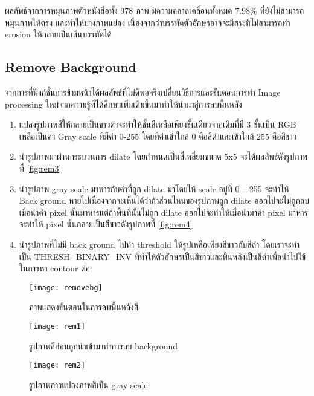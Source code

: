 ผลลัพธ์จากการหมุนภาพตัวหนังสือทั้ง 978 ภาพ มีความคลาดเคลื่อนทั้งหมด 7.98\% ที่ยังไม่สามารถหมุนภาพให้ตรง และทำให้บางภาพแย่ลง เนื่องจากว่าบรรทัดตัวอักษรอาจจะมีสระที่ไม่สามารถทำ erosion ให้กลายเป็นเส้นบรรทัดได้
\subsection{Remove Background}

จากการที่ฟังก์ชั่นการข้ามหน้าได้ผลลัพธ์ที่ไม่ดีพอจริงเปลี่ยนวิธีการและขั้นตอนการทำ Image processing ใหม่จากความรู้ที่ได้ศึกษาเพิ่มเติมขึ้นมาทำให้นำมาสู่การลบพื้นหลัง

\begin{enumerate}
    \item แปลงรูปภาพสีให้กลายเป็นขาวดำจะทำให้ชั้นสีเหลือเพียงชั้นเดียวจากเดิมที่มี 3 ชั้นเป็น RGB เหลือเป็นค่า Gray scale ที่มีค่า 0-255 โดยที่ค่าเข้าใกล้ 0 คือสีดำและเข้าใกล้ 255 คือสีขาว
    \item นำรูปภาพมาผ่านกระบวนการ dilate โดยกำหนดเป็นสี่เหลี่ยมขนาด 5x5 จะได้ผลลัพธ์ดังรูปภาพที่ \ref{fig:rem3}
    \item นำรูปภาพ gray scale มาหารกับค่าที่ถูก dilate มาโดยให้ scale อยู่ที่ 0 – 255 จะทำให้ Back ground หายไปเนื่องจากจะเห็นได้ว่าถ้าส่วนไหนของรูปภาพถูก dilate ออกไปจะไม่ถูกลบเมื่อนำค่า pixel นั้นมาหารแต่ถ้าพื้นที่นั้นไม่ถูก dilate ออกไปจะทำให้เมื่อนำมาค่า pixel มาหารจะทำให้ pixel นั้นกลายเป็นสีขาวดังรูปภาพที่ \ref{fig:rem4}
    \item นำรูปภาพที่ไม่มี back ground ไปทำ threshold ให้รูปเหลือเพียงสีขาวกับสีดำ โดยเราจะทำเป็น THRESH\_BINARY\_INV ที่ทำให้ตัวอักษรเป็นสีขาวและพื้นหลังเป็นสีดำเพื่อนำไปใช้ในการหา contour ต่อ
    \end{enumerate}

\begin{figure}[H]
    \centering
    \texttt{[image: removebg]}
    \caption{ภาพแสดงขั้นตอนในการลบพื้นหลังสี}\label{fig:removebg}
\end{figure}

\begin{figure}[H]
    \centering
    \texttt{[image: rem1]}
    \caption{รูปภาพสีก่อนถูกนำเข้ามาทำการลบ background}\label{fig:rem1}
\end{figure}

\begin{figure}[H]
    \centering
    \texttt{[image: rem2]}
    \caption{รูปภาพการแปลงภาพสีเป็น gray scale}\label{fig:rem2}
\end{figure}

